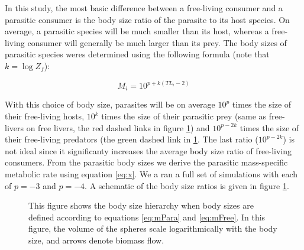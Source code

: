 \documentclass[11pt]{amsart}
\begin{document}
 In this study, the most basic difference between a free-living consumer and a parasitic consumer is the body size ratio of the parasite to its host species.  On average, a parasitic species will be much smaller than its host, whereas a free-living consumer will generally be much larger than its prey.  The body sizes of parasitic species weres determined using the following formula (note that $k = \log Z_f$):

\begin{equation}
M_i = 10^{p + k(TL_i -2)} \label{eq:mPara}
\end{equation}

With this choice of body size, parasites will be on average $10^{p}$ times the size of their free-living hosts, $10^k$ times the size of their parasitic prey (same as free-livers on free livers, the red dashed links in figure \ref{fig:bsrCartoon}) and $10^{p-2k}$ times the size of their free-living predators (the green dashed link in \ref{fig:bsrCartoon}.  The last ratio ($10^{p-2k}$) is not ideal since it significanty increases the average body size ratio of free-living consumers.  From the parasitic body sizes we derive the parasitic mass-specific metabolic rate using equation \eqref{eq:x}.  We a ran a full set of simulations with each of $p=-3$ and $p=-4$.  A schematic of the body size ratios is given in figure \ref{fig:bsrCartoon}.

\begin{figure}
\caption{This figure shows the body size hierarchy when body sizes are defined according to equations \eqref{eq:mPara} and \eqref{eq:mFree}. In this figure, the volume of the spheres scale logarithmically with the body size, and arrows denote biomass flow. \label{fig:bsrCartoon}}
\end{figure}
\end{document}
